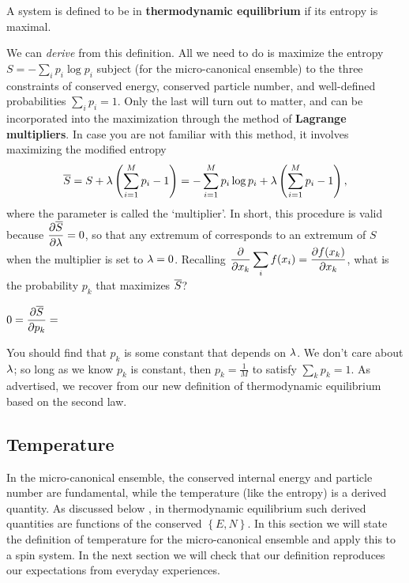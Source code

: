 \begin{shaded}
  A system is defined to be in \textbf{thermodynamic equilibrium} if its entropy is maximal.
\end{shaded}

We can \textit{derive}  from this definition.
All we need to do is maximize the entropy $S = - \sum_i p_i \log p_i$ subject (for the micro-canonical ensemble) to the three constraints of conserved energy, conserved particle number, and well-defined probabilities $\sum_i p_i = 1$.
Only the last will turn out to matter, and can be incorporated into the maximization through the method of \textbf{Lagrange multipliers}.
In case you are not familiar with this method, it involves maximizing the modified entropy
\begin{equation*}
  \overline S = S + \lambda\left(\sum_{i = 1}^M p_i - 1\right) = - \sum_{i = 1}^M p_i \log p_i + \lambda\left(\sum_{i = 1}^M p_i - 1\right),
\end{equation*}
where the parameter \la is called the `multiplier'.
In short, this procedure is valid because $\displaystyle \frac{\partial \overline S}{\partial \lambda} = 0$, so that any extremum of \Sbar corresponds to an extremum of $S$ when the multiplier is set to $\lambda = 0$.
Recalling $\displaystyle \frac{\partial }{\partial x_k} \sum_i f(x_i) = \frac{\partial f(x_k)}{\partial x_k}$, what is the probability $p_k$ that maximizes $\overline S$?
\begin{mdframed}
  $\displaystyle 0 = \frac{\partial \overline S}{\partial p_k} = $ \\[100 pt]
\end{mdframed}
You should find that $p_k$ is some constant that depends on $\lambda$.
We don't care about $\lambda$; so long as we know $p_k$ is constant, then $p_k = \frac{1}{M}$ to satisfy $\sum_k p_k = 1$.
As advertised, we recover  from our new definition of thermodynamic equilibrium based on the second law.



\subsection{Temperature}
In the micro-canonical ensemble, the conserved internal energy and particle number are fundamental, while the temperature (like the entropy) is a derived quantity.
As discussed below , in thermodynamic equilibrium such derived quantities are functions of the conserved $\left\{E, N\right\}$.
In this section we will state the definition of temperature for the micro-canonical ensemble and apply this to a spin system.
In the next section we will check that our definition reproduces our expectations from everyday experiences.

